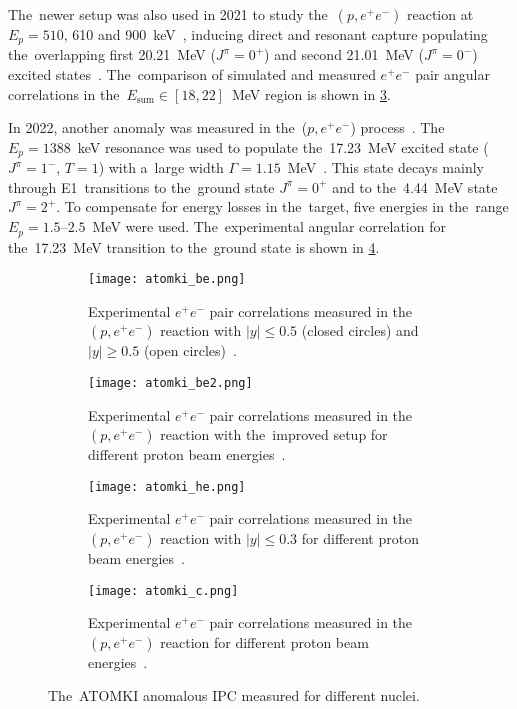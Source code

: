 			The~newer setup was also used in 2021 to study the~$(p,e^+ e^-)$ reaction at $E_p = 510$, 610 and 900~keV~\cite{atomki_he2}, inducing direct and resonant capture populating the~overlapping first 20.21~MeV ($J^\pi = 0^+$) and second 21.01~MeV ($J^\pi = 0^-$) excited states~\cite{resonances2}. The~comparison of simulated and measured $e^+e^-$ pair angular correlations in the~${E_\text{sum}\in[18,22]}$~MeV region is shown in \cref{fig:atomki_he}.
			
			In 2022, another anomaly was measured in the~($p,e^+e^-$) process~\cite{atomki_c}. The~$E_p = 1388$~keV resonance was used to populate the~17.23~MeV excited state ($J^\pi = 1^-$, $T = 1$) with a~large width $\Gamma = 1.15$~MeV~\cite{resonances3}. This state decays mainly through E1~transitions to the~ground state $J^\pi = 0^+$ and to the~4.44~MeV state $J^\pi = 2^+$. To compensate for energy losses in the~target, five energies in the~range $E_p = 1.5\text{--}2.5$~MeV were used. The~experimental angular correlation for the~17.23~MeV transition to the~ground state is shown in \cref{fig:atomki_c}.
			
				\begin{figure}
					\centering
					\begin{subfigure}[t]{0.48\textwidth}
						\centering
						\texttt{[image: atomki\_be.png]}
						\caption{Experimental $e^+e^-$ pair correlations measured in the~$(p,e^+e^-)$ reaction with $|y| \leq 0.5$ (closed circles) and $|y| \geq 0.5$ (open circles)~\cite{atomki_be}.}
						\label{fig:atomki_be}
					\end{subfigure}
					\hfill
					\begin{subfigure}[t]{0.42\textwidth}
						\centering
						\texttt{[image: atomki\_be2.png]}
						\caption{Experimental $e^+e^-$ pair correlations measured in the~$(p,e^+e^-)$ reaction with the~improved setup for different proton beam energies~\cite{atomki_be2}.}
						\label{fig:atomki_be2}
					\end{subfigure}
					\begin{subfigure}[t]{0.45\textwidth}
						\centering
						\texttt{[image: atomki\_he.png]}
						\caption{Experimental $e^+e^-$ pair correlations measured in the~$(p,e^+e^-)$ reaction with $|y| \leq 0.3$ for different proton beam energies~\cite{atomki_he2}.}
						\label{fig:atomki_he}
					\end{subfigure}
					\hfill
					\begin{subfigure}[t]{0.45\textwidth}
						\centering
						\texttt{[image: atomki\_c.png]}
						\caption{Experimental $e^+e^-$ pair correlations measured in the~$(p,e^+e^-)$ reaction for different proton beam energies~\cite{atomki_c}.}
						\label{fig:atomki_c}
					\end{subfigure}
					\caption{The~ATOMKI anomalous \ac{IPC} measured for different nuclei.}
					\label{fig:atomki}
				\end{figure}
			
